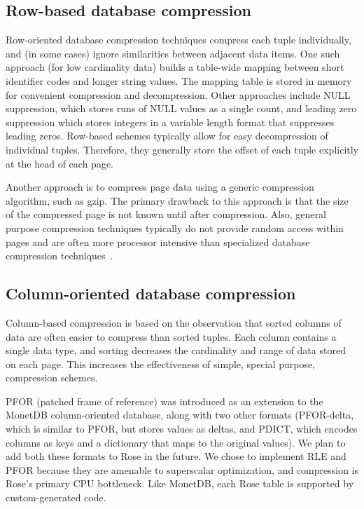 \documentclass{vldb}
\newcommand{\rows}{Rose\xspace}
\newcommand{\rowss}{Rose's\xspace}
\begin{document}
\subsection{Row-based database compression}

Row-oriented database compression techniques compress each tuple
individually, and (in some cases) ignore similarities between adjacent
data items.  One such approach (for low cardinality data) builds a
table-wide mapping between short identifier codes and longer string
values. The mapping table is stored in memory for convenient
compression and decompression.  Other approaches include NULL
suppression, which stores runs of NULL values as a single count, and
leading zero suppression which stores integers in a variable length
format that suppresses leading zeros.  Row-based schemes typically
allow for easy decompression of individual tuples.  Therefore, they
generally store the offset of each tuple explicitly at the head of
each page.

Another approach is to compress page data using a generic compression
algorithm, such as gzip.  The primary drawback to this approach is
that the size of the compressed page is not known until after
compression.  Also, general purpose compression techniques typically
do not provide random access within pages and are often more processor
intensive than specialized database compression
techniques~\cite{rowImplementationPerf}.

\subsection{Column-oriented database compression}

Column-based compression is based on the observation that sorted
columns of data are often easier to compress than sorted tuples.  Each
column contains a single data type, and sorting decreases the
cardinality and range of data stored on each page.  This increases the
effectiveness of simple, special purpose, compression schemes.

PFOR (patched frame of reference) was introduced as an extension to
the MonetDB\cite{pfor} column-oriented database, along with two other
formats (PFOR-delta, which is similar to PFOR, but stores values as
deltas, and PDICT, which encodes columns as keys and a dictionary that
maps to the original values).  We plan to add both these formats to
\rows in the future.  We chose to implement RLE and PFOR because they
are amenable to superscalar optimization, and compression is \rowss
primary CPU bottleneck.  Like MonetDB, each \rows table is supported
by custom-generated code.
\end{document}
